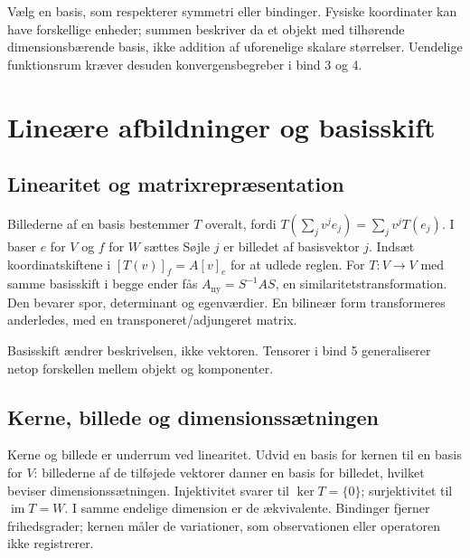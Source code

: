 

Vælg en basis, som respekterer symmetri eller bindinger.
Fysiske koordinater kan have forskellige enheder; summen beskriver da
et objekt med tilhørende dimensionsbærende basis, ikke addition af
uforenelige skalare størrelser. Uendelige funktionsrum kræver desuden
konvergensbegreber i bind 3 og 4.

\section{Lineære afbildninger og basisskift}
\subsection{Linearitet og matrixrepræsentation}
Billederne af en basis bestemmer $T$ overalt, fordi
$T(\sum_j v^je_j)=\sum_j v^jT(e_j)$.
I baser $e$ for $V$ og $f$ for $W$ sættes
Søjle $j$ er billedet af basisvektor $j$.
Indsæt koordinatskiftene i $[T(v)]_f=A[v]_e$ for at udlede reglen.
For $T:V\to V$ med samme basisskift i begge ender fås
$A_{\mathrm{ny}}=S^{-1}AS$, en similaritetstransformation.
Den bevarer spor, determinant og egenværdier. En bilineær form
transformeres anderledes, med en transponeret/adjungeret matrix.



Basisskift ændrer beskrivelsen, ikke vektoren.
Tensorer i bind 5 generaliserer netop forskellen mellem objekt og komponenter.



\subsection{Kerne, billede og dimensionssætningen}
Kerne og billede er underrum ved linearitet. Udvid en basis for kernen
til en basis for $V$: billederne af de tilføjede vektorer danner en basis
for billedet, hvilket beviser dimensionssætningen.
Injektivitet svarer til $\ker T=\{0\}$; surjektivitet til
$\operatorname{im}T=W$. I samme endelige dimension er de ækvivalente.
Bindinger fjerner frihedsgrader; kernen måler de variationer, som
observationen eller operatoren ikke registrerer.


